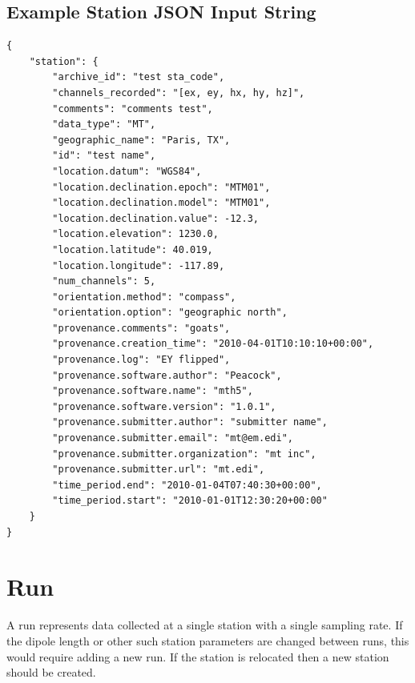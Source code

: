 \documentclass{article}
\begin{document}
\newpage
\subsection{Example Station JSON Input String}

\begin{verbatim}
{
    "station": {
        "archive_id": "test sta_code",
        "channels_recorded": "[ex, ey, hx, hy, hz]",
        "comments": "comments test",
        "data_type": "MT",
        "geographic_name": "Paris, TX",
        "id": "test name",
        "location.datum": "WGS84",
        "location.declination.epoch": "MTM01",
        "location.declination.model": "MTM01",
        "location.declination.value": -12.3,
        "location.elevation": 1230.0,
        "location.latitude": 40.019,
        "location.longitude": -117.89,
        "num_channels": 5,
        "orientation.method": "compass",
        "orientation.option": "geographic north",
        "provenance.comments": "goats",
        "provenance.creation_time": "2010-04-01T10:10:10+00:00",
        "provenance.log": "EY flipped",
        "provenance.software.author": "Peacock",
        "provenance.software.name": "mth5",
        "provenance.software.version": "1.0.1",
        "provenance.submitter.author": "submitter name",
        "provenance.submitter.email": "mt@em.edi",
        "provenance.submitter.organization": "mt inc",
        "provenance.submitter.url": "mt.edi",
        "time_period.end": "2010-01-04T07:40:30+00:00",
        "time_period.start": "2010-01-01T12:30:20+00:00"
    }
}
\end{verbatim}

\newpage
\section{Run}

A run represents data collected at a single station with a single sampling rate. If the dipole length or other such station parameters are changed between runs, this would require adding a new run.  If the station is relocated then a new station should be created.
\end{document}
